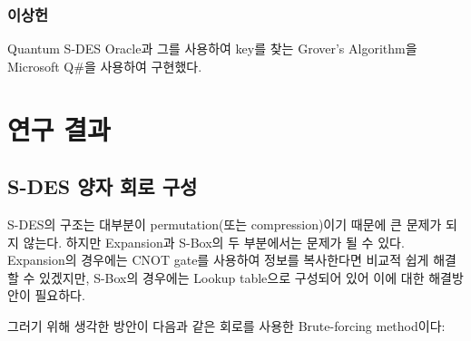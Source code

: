 \documentclass{article}
\theoremstyle{break}
\begin{document}
	\subsubsection{이상헌}
	
	Quantum S-DES Oracle과 그를 사용하여 key를 찾는 Grover's Algorithm을 Microsoft Q\#을 사용하여 구현했다.
	
	\section{연구 결과}
	
    \subsection{S-DES 양자 회로 구성}
	S-DES의 구조는 대부분이 permutation(또는 compression)이기 때문에 큰 문제가 되지 않는다. 하지만 Expansion과 S-Box의 두 부분에서는 문제가 될 수 있다. Expansion의 경우에는 CNOT gate를 사용하여 정보를 복사한다면 비교적 쉽게 해결할 수 있겠지만, S-Box의 경우에는 Lookup table으로 구성되어 있어 이에 대한 해결방안이 필요하다.
	
	그러기 위해 생각한 방안이 다음과 같은 회로를 사용한 Brute-forcing method이다:
	
	\begin{center}
	\end{center}
	
\end{document}
